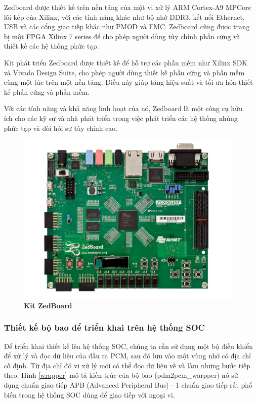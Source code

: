 Zedboard được thiết kế trên nền tảng của một vi xử lý ARM Cortex-A9 MPCore lõi kép của Xilinx, với các tính năng khác như bộ nhớ DDR3, kết nối Ethernet, USB và các cổng giao tiếp khác như PMOD và FMC. Zedboard cũng được trang bị một FPGA Xilinx 7 series để cho phép người dùng tùy chỉnh phần cứng và thiết kế các hệ thống phức tạp.


Kit phát triển Zedboard được thiết kế để hỗ trợ các phần mềm như Xilinx SDK và Vivado Design Suite, cho phép người dùng thiết kế phần cứng và phần mềm cùng một lúc trên một nền tảng. Điều này giúp tăng hiệu suất và tối ưu hóa thiết kế phần cứng và phần mềm.

Với các tính năng và khả năng linh hoạt của nó, Zedboard là một công cụ hữu ích cho các kỹ sư và nhà phát triển trong việc phát triển các hệ thống nhúng phức tạp và đòi hỏi sự tùy chỉnh cao.

\begin{figure}[H]
    \centering
    \includegraphics[width=12cm]{Images/Chuong5/fpga/zedboard.jpg}
    \caption[Kit ZedBoard]{\bfseries \fontsize{12pt}{0pt}\selectfont Kit ZedBoard}
    \label{zedboard}
\end{figure}

\subsubsection{Thiết kế bộ bao để triển khai trên hệ thống SOC} \label{wrapper_cha}

Để triển khai thiết kế lên hệ thống SOC, chúng ta cần sử dụng một bộ điều khiển để xử lý và đọc dữ liệu của đầu ra PCM, sau đó lưu vào một vùng nhớ có địa chỉ cố định. Từ địa chỉ đó vi xử lý mới có thể đọc dữ liệu về và làm những bước tiếp theo. Hình \ref{wrapper} mô tả kiến trúc của bộ bao (pdm2pcm\_warpper) nó sử dụng chuẩn giao tiếp APB (Advanced Peripheral Bus) -  1 chuẩn giao tiếp rất phổ biến trong hệ thống SOC dùng để giao tiếp với ngoại vi.

